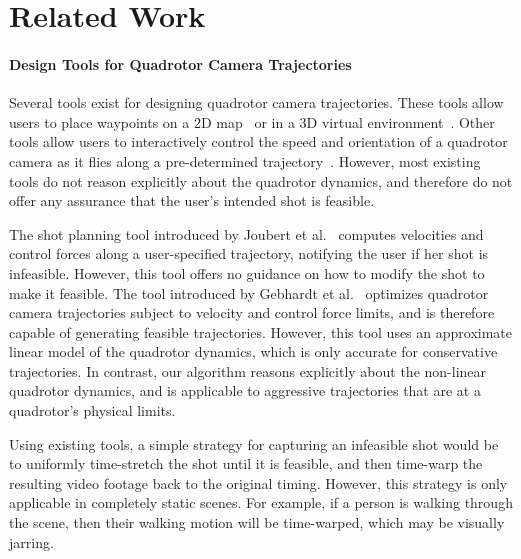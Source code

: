 \section{Related Work}

\paragraph{Design Tools for Quadrotor Camera Trajectories}

Several tools exist for designing quadrotor camera trajectories.
These tools allow users to place waypoints on a 2D map~\cite{apm:2015,dji:2015} or in a 3D virtual environment~\cite{meier:2012,joubert:2015,gebhardt:2016}.
Other tools allow users to interactively control the speed and orientation of a quadrotor camera as it flies along a pre-determined trajectory~\cite{3drobotics:2015,dji:2015a,joubert:2015}. 
However, most existing tools do not reason explicitly about the quadrotor dynamics, and therefore do not offer any assurance that the user's intended shot is feasible.


The shot planning tool introduced by Joubert et al.~ computes velocities and control forces along a user-specified trajectory, notifying the user if her shot is infeasible. However, this tool offers no guidance on how to modify the shot to make it feasible.
The tool introduced by Gebhardt et al.~ optimizes quadrotor camera trajectories subject to velocity and control force limits, and is therefore capable of generating feasible trajectories.
However, this tool uses an approximate linear model of the quadrotor dynamics, which is only accurate for conservative trajectories.
In contrast, our algorithm reasons explicitly about the non-linear quadrotor dynamics, and is applicable to aggressive trajectories that are at a quadrotor's physical limits.

Using existing tools, a simple strategy for capturing an infeasible shot would be to uniformly time-stretch the shot until it is feasible, and then time-warp the resulting video footage back to the original timing.
However, this strategy is only applicable in completely static scenes.
For example, if a person is walking through the scene, then their walking motion will be time-warped, which may be visually jarring.


